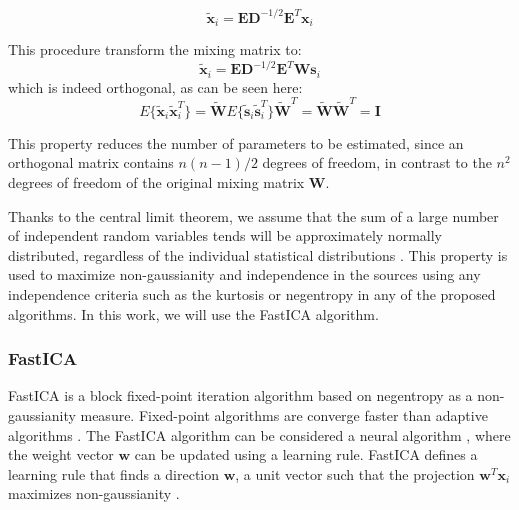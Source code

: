\begin{equation}
\tilde{\mathbf{x}}_i= \mathbf{E}\mathbf{D}^{-1/2}\mathbf{E}^T\mathbf{x}_i
\end{equation}

This procedure transform the mixing matrix to:
\begin{equation}
\tilde{\mathbf{x}}_i = \mathbf{E}\mathbf{D}^{-1/2}\mathbf{E}^T \mathbf{W}\mathbf{s}_i
\end{equation}
which is indeed orthogonal, as can be seen here:
\begin{equation}
E\{\tilde{\mathbf{x}}_i\tilde{\mathbf{x}}_i^T\} = \tilde{\mathbf{W}} E\{\tilde{\mathbf{s}}_i\tilde{\mathbf{s}}_i^T\}\tilde{\mathbf{W}}^T 	=\tilde{\mathbf{W}}\tilde{\mathbf{W}}^T=\mathbf{I}
\end{equation}

This property reduces the number of parameters to be estimated, since an orthogonal matrix contains $n(n-1)/2$ degrees of freedom, in contrast to the $n^2$ degrees of freedom of the original mixing matrix $\mathbf{W}$. 

Thanks to the central limit theorem, we assume that the sum of a large number of independent random variables tends will be approximately normally distributed, regardless of the individual statistical distributions \cite{Rice2006}. This property is used to maximize non-gaussianity and independence in the sources using any independence criteria such as the kurtosis or negentropy in any of the proposed algorithms. In this work, we will use the FastICA algorithm. 

\subsubsection{FastICA}
FastICA is a block fixed-point iteration algorithm \cite{Oja1997,FastICA99} based on negentropy as a non-gaussianity measure. Fixed-point algorithms are converge faster than adaptive algorithms \cite{FastICA99}. The FastICA algorithm can be considered a neural algorithm \cite{Hyvarinen2000}, where the weight vector $\mathbf{w}$ can be updated using a learning rule. FastICA defines a learning rule that finds a direction $\mathbf{w}$, a unit vector such that the projection $\mathbf{w}^T\mathbf{x}_i$ maximizes non-gaussianity \cite{FastICA99}. 

